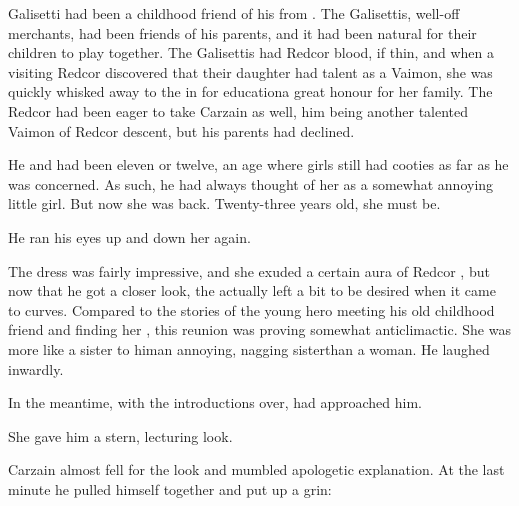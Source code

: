 
\Racel{} Galisetti had been a childhood friend of his from \Redglen. 
The Galisettis, well-off merchants, had been friends of his parents, and it had been natural for their children to play together. 
The Galisettis had Redcor blood, if thin, and when a visiting Redcor discovered that their daughter had talent as a Vaimon, she was quickly whisked away to the \TopazChateau{} in \Redce{} for education\dash a great honour for her family. 
The Redcor had been eager to take Carzain as well, him being another talented Vaimon of Redcor descent, but his parents had declined. 

He and \Racel{} had been eleven or twelve, an age where girls still had cooties as far as he was concerned. 
As such, he had always thought of her as a somewhat annoying little girl. 
But now she was back. 
Twenty-three years old, she must be. 


He ran his eyes up and down her again. 


The dress was fairly impressive, and she exuded a certain aura of Redcor \emph{\noblesse}, but now that he got a closer look, the  actually left a bit to be desired when it came to curves. 
Compared to the stories of the young hero meeting his old childhood friend and finding her , this reunion was proving somewhat anticlimactic. 
She was more like a sister to him\dash an annoying, nagging sister\dash than a  woman. 
He laughed inwardly. 

In the meantime, with the introductions over, \Racel{} had approached him. 


She gave him a stern, lecturing look. 

Carzain almost fell for the look and mumbled apologetic explanation. 
At the last minute he pulled himself together and put up a grin: 

